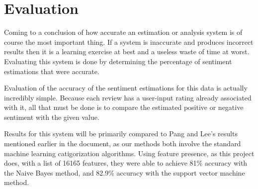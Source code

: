 \section{Evaluation}
Coming to a conclusion of how accurate an estimation or analysis system is of course the most important thing. If a system is inaccurate and produces incorrect results then it is a learning exercise at best and a useless waste of time at worst. Evaluating this system is done by determining the percentage of sentiment estimations that were accurate.

Evaluation of the accuracy of the sentiment estimations for this data is actually incredibly simple. Because each review has a user-input rating already associated with it, all that must be done is to compare the estimated positive or negative sentiment with the given value.

Results for this system will be primarily compared to Pang and Lee's results mentioned earlier in the document, as our methods both involve the standard machine learning catigorization algorithms. Using feature presence, as this project does, with a list of 16165 features, they were able to achieve 81\% accuracy with the Naive Bayes method, and 82.9\% accuracy with the support vector machine method. 
